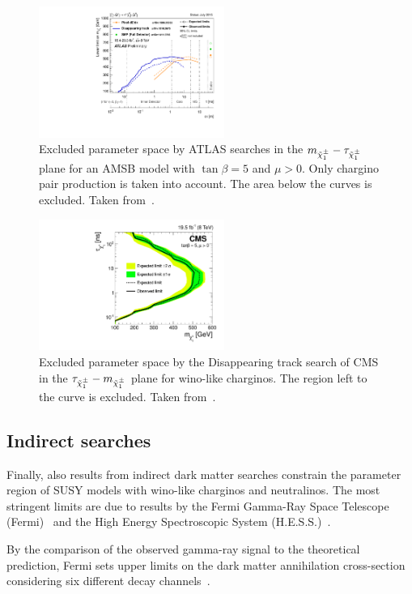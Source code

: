 \begin{figure}[!h]
  \centering
      \includegraphics[width=0.54\textwidth]{figures/theory/ATLAS_SUSY_LLPChargino.pdf}
  \caption{Excluded parameter space by ATLAS searches in the $m_{\tilde{\chi}^{\pm}_{1}}-\tau_{\tilde{\chi}^{\pm}_{1}}$ plane for an AMSB model with $\tan\beta=5$ and $\mu>0$. Only chargino pair production is taken into account. The area below the curves is excluded. Taken from~\cite{bib:ATLAS_SUMMARYPLOTS}.}  
  \label{fig:ATLAS}
\end{figure}
\begin{figure}[!h]
  \centering
      \includegraphics[width=0.54\textwidth]{figures/theory/lifetimeNs_vs_mass.pdf}
  \caption{Excluded parameter space by the Disappearing track search of CMS in the $\tau_{\tilde{\chi}^{\pm}_{1}}-m_{\tilde{\chi}^{\pm}_{1}}$ plane for wino-like charginos. The region left to the curve is excluded. Taken from~\cite{bib:CMS:DT_8TeV}.}  
  \label{fig:CMS}
\end{figure}

\subsection*{Indirect searches}
Finally, also results from indirect dark matter searches constrain the parameter region of SUSY models with wino-like charginos and neutralinos.
The most stringent limits are due to results by the Fermi Gamma-Ray Space Telescope (Fermi)~\cite{bib:Fermi} and the High Energy Spectroscopic System (H.E.S.S.)~\cite{bib:HESS}.

By the comparison of the observed gamma-ray signal to the theoretical prediction, Fermi sets upper limits on the dark matter annihilation cross-section considering six different decay channels~\cite{bib:Fermi_DM}.

